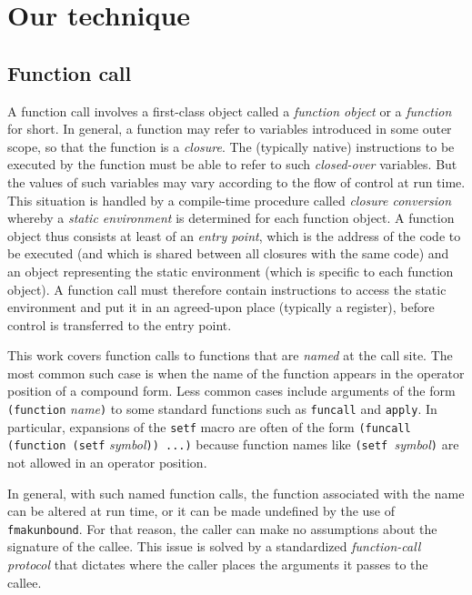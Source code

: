 \section{Our technique}
\label{sec-our-technique}

\subsection{Function call}

A function call involves a first-class object called a \emph{function
  object} or a \emph{function} for short.  In general, a function may
refer to variables introduced in some outer scope, so that the
function is a \emph{closure}.  The (typically native) instructions to
be executed by the function must be able to refer to such
\emph{closed-over} variables.  But the values of such variables may
vary according to the flow of control at run time.  This situation is
handled by a compile-time procedure called \emph{closure conversion}
whereby a \emph{static environment} is determined for each function
object.  A function object thus consists at least of an \emph{entry
  point}, which is the address of the code to be executed (and which
is shared between all closures with the same code) and an object
representing the static environment (which is specific to each
function object).  A function call must therefore contain instructions
to access the static environment and put it in an agreed-upon place
(typically a register), before control is transferred to the entry
point.

This work covers function calls to functions that are \emph{named} at
the call site.  The most common such case is when the name of the
function appears in the operator position of a compound form.  Less
common cases include arguments of the form \texttt{(function}
\textit{name}\texttt{)} to some standard functions such as
\texttt{funcall} and \texttt{apply}.  In particular, expansions of the
\texttt{setf} macro are often of the form \texttt{(funcall (function
  (setf} \textit{symbol}\texttt{)) ...)}  because function names like
\texttt{(setf }\textit{symbol}\texttt{)} are not allowed in an
operator position.

In general, with such named function calls, the function associated
with the name can be altered at run time, or it can be made undefined
by the use of \texttt{fmakunbound}.  For that reason, the caller can
make no assumptions about the signature of the callee.  This issue is
solved by a standardized \emph{function-call protocol} that dictates
where the caller places the arguments it passes to the callee.

